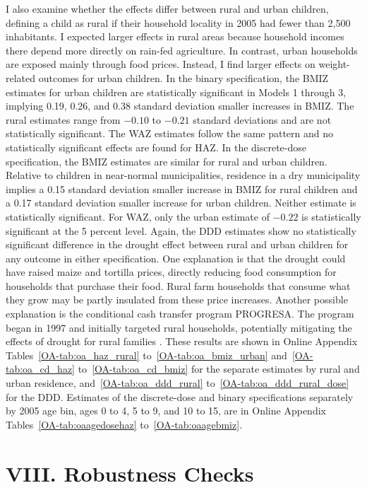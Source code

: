 \documentclass[12pt]{article}
\begin{document}
I also examine whether the effects differ between rural and urban children, defining a child as rural if their household locality in 2005 had fewer than 2,500 inhabitants. I expected larger effects in rural areas because household incomes there depend more directly on rain-fed agriculture. In contrast, urban households are exposed mainly through food prices. Instead, I find larger effects on weight-related outcomes for urban children. In the binary specification, the BMIZ estimates for urban children are statistically significant in Models 1 through 3, implying 0.19, 0.26, and 0.38 standard deviation smaller increases in BMIZ. The rural estimates range from $-0.10$ to $-0.21$ standard deviations and are not statistically significant. The WAZ estimates follow the same pattern and no statistically significant effects are found for HAZ. In the discrete-dose specification, the BMIZ estimates are similar for rural and urban children. Relative to children in near-normal municipalities, residence in a dry municipality implies a 0.15 standard deviation smaller increase in BMIZ for rural children and a 0.17 standard deviation smaller increase for urban children. Neither estimate is statistically significant. For WAZ, only the urban estimate of $-0.22$ is statistically significant at the 5 percent level. Again, the DDD estimates show no statistically significant difference in the drought effect between rural and urban children for any outcome in either specification. One explanation is that the drought could have raised maize and tortilla prices, directly reducing food consumption for households that purchase their food. Rural farm households that consume what they grow may be partly insulated from these price increases. Another possible explanation is the conditional cash transfer program PROGRESA. The program began in 1997 and initially targeted rural households, potentially mitigating the effects of drought for rural families \parencite{adhvaryuHelpingChildrenCatch2024}. These results are shown in Online Appendix Tables~\ref{OA-tab:oa_haz_rural} to~\ref{OA-tab:oa_bmiz_urban} and~\ref{OA-tab:oa_cd_haz} to~\ref{OA-tab:oa_cd_bmiz} for the separate estimates by rural and urban residence, and~\ref{OA-tab:oa_ddd_rural} to~\ref{OA-tab:oa_ddd_rural_dose} for the DDD. Estimates of the discrete-dose and binary specifications separately by 2005 age bin, ages 0 to 4, 5 to 9, and 10 to 15, are in Online Appendix Tables~\ref{OA-tab:oaagedosehaz} to~\ref{OA-tab:oaagebmiz}.

\section*{VIII. Robustness Checks}\label{sec:VIII}
\end{document}
